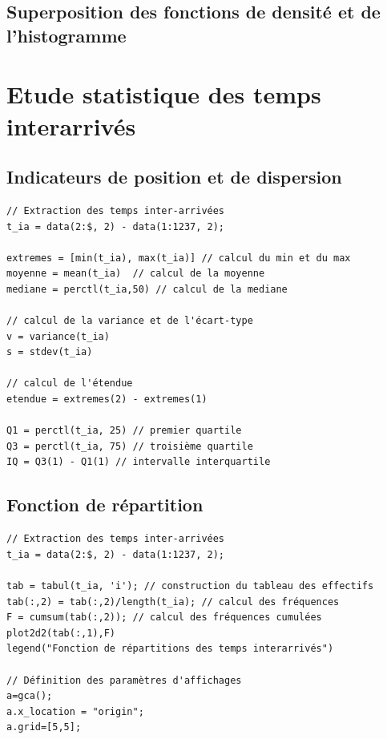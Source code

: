 \documentclass{article}
\begin{document}
\paragraph{}

\subsection{Superposition des fonctions de densité et de l'histogramme}

\newpage
\appendix

\section{Etude statistique des temps interarrivés}

\subsection{Indicateurs de position et de dispersion}
\begin{verbatim}
// Extraction des temps inter-arrivées
t_ia = data(2:$, 2) - data(1:1237, 2);

extremes = [min(t_ia), max(t_ia)] // calcul du min et du max
moyenne = mean(t_ia)  // calcul de la moyenne
mediane = perctl(t_ia,50) // calcul de la mediane

// calcul de la variance et de l'écart-type
v = variance(t_ia)
s = stdev(t_ia)

// calcul de l'étendue
etendue = extremes(2) - extremes(1)

Q1 = perctl(t_ia, 25) // premier quartile
Q3 = perctl(t_ia, 75) // troisième quartile
IQ = Q3(1) - Q1(1) // intervalle interquartile
\end{verbatim}

\subsection{Fonction de répartition}
\begin{verbatim}
// Extraction des temps inter-arrivées
t_ia = data(2:$, 2) - data(1:1237, 2);

tab = tabul(t_ia, 'i'); // construction du tableau des effectifs
tab(:,2) = tab(:,2)/length(t_ia); // calcul des fréquences
F = cumsum(tab(:,2)); // calcul des fréquences cumulées
plot2d2(tab(:,1),F)
legend("Fonction de répartitions des temps interarrivés")

// Définition des paramètres d'affichages
a=gca();
a.x_location = "origin";
a.grid=[5,5];

\end{verbatim}
\end{document}
